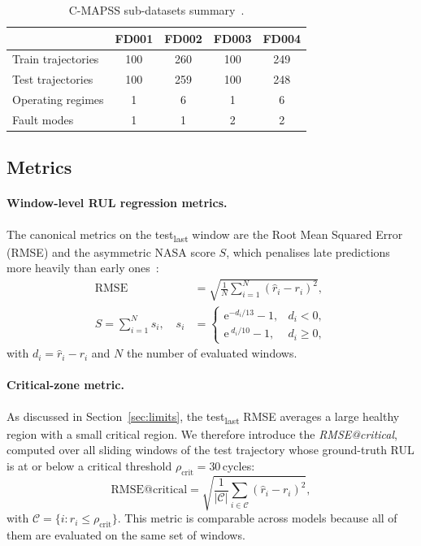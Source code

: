 \documentclass[5p,times,authoryear]{elsarticle}
\begin{document}
\begin{table}[!t]
\centering
\caption{C-MAPSS sub-datasets summary~\citep{saxena2008damage}.}
\label{tab:cmapss-summary}
\begin{tabular}{lcccc}
\toprule
& FD001 & FD002 & FD003 & FD004 \\
\midrule
Train trajectories & 100 & 260 & 100 & 249 \\
Test trajectories  & 100 & 259 & 100 & 248 \\
Operating regimes  &   1 &   6 &   1 &   6 \\
Fault modes        &   1 &   1 &   2 &   2 \\
\bottomrule
\end{tabular}
\end{table}

\subsection{Metrics}\label{sec:method-metrics}

\paragraph{Window-level RUL regression metrics.} The canonical metrics on the test\textsubscript{last} window are the Root Mean Squared Error (RMSE) and the asymmetric NASA score $S$, which penalises late predictions more heavily than early ones~\citep{saxena2008damage}:
\begin{align}
\mathrm{RMSE} &= \sqrt{\tfrac{1}{N}\sum_{i=1}^{N}(\hat r_i-r_i)^2},\label{eq:rmse}\\
S = \sum_{i=1}^{N} s_i,\quad s_i &=
\begin{cases}
\mathrm{e}^{-d_i/13}-1, & d_i<0,\\
\mathrm{e}^{\;d_i/10}-1, & d_i\ge 0,
\end{cases}\label{eq:nasa}
\end{align}
with $d_i=\hat r_i-r_i$ and $N$ the number of evaluated windows.

\paragraph{Critical-zone metric.} As discussed in Section~\ref{sec:limits}, the test\textsubscript{last} RMSE averages a large healthy region with a small critical region. We therefore introduce the \emph{RMSE@critical}, computed over all sliding windows of the test trajectory whose ground-truth RUL is at or below a critical threshold $\rho_{\mathrm{crit}}=30$\,cycles:
\begin{equation}
\mathrm{RMSE@critical} = \sqrt{\frac{1}{|\mathcal{C}|}\sum_{i\in\mathcal{C}}(\hat r_i-r_i)^2},
\label{eq:rmsecrit}
\end{equation}
with $\mathcal{C} = \{i:r_i\le \rho_{\mathrm{crit}}\}$. This metric is comparable across models because all of them are evaluated on the same set of windows.
\end{document}
